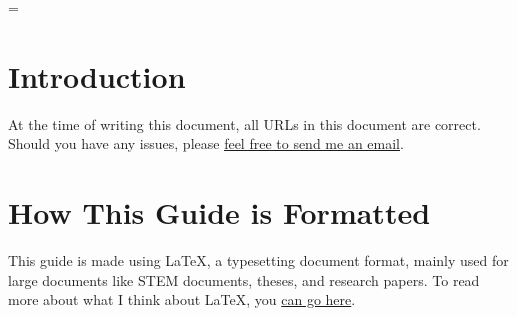 \lstset{        %
  basicstyle=\ttfamily,
  frame=single,
  breaklines=true
}

\emergencystretch=\maxdimen
{}

\maketitle              %
\newpage                %
\tableofcontents        %

\clearpage
\listoftodos			%

\newpage                %

\section{Introduction}

At the time of writing this document, all URLs in this document are correct.
Should you have any issues, please
\underline{\href{mailto:HusseinEsmailContact@gmail.com}
{feel free to send me an email}}.

\section{How This Guide is Formatted}
This guide is made using \LaTeX{}, a typesetting document format, mainly used
for large documents like STEM documents, theses, and research papers. To read
more about what I think about \LaTeX{}, you
\href{https://husseinesmail.xyz/articles/is-latex-better.html}{can go here}.


